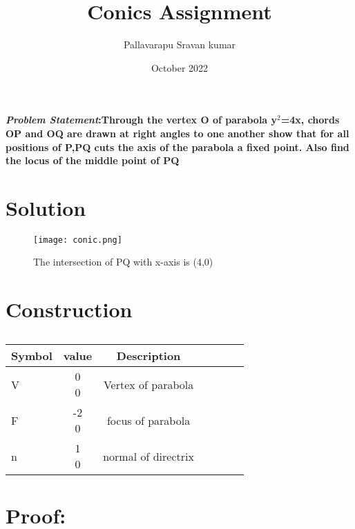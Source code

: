 \documentclass[journal,10pt,twocolumn]{article}
\title{\textbf{Conics Assignment}}
\author{Pallavarapu Sravan kumar}
\date{October 2022}
\newcommand{\myvec}[1]{\ensuremath{\begin{pmatrix}#1\end{pmatrix}}}
\begin{document}
\maketitle
\paragraph{\textit{\large Problem Statement}:Through the vertex O of parabola y$^2$=4x, chords OP and OQ are drawn at right angles to one another show that for all positions of P,PQ cuts the axis of the parabola a fixed point. Also find the locus of the middle point of PQ}
\section*{\large Solution}
\begin{figure}[H]
\centering
\texttt{[image: conic.png]}
\caption{The intersection of PQ with x-axis  is (4,0)}
\end{figure}

\section*{\large Construction}

\begin{table}[htbp]
 \begin{center}
    \begin{tabular}{|l|c|c|c|c|c|c} \hline \textbf{Symbol}
  & \textbf{value} & \textbf{Description} \\
 \hline
V &\myvec{0\\0} & Vertex of parabola\\ \hline
F&\myvec{-2\\0} & focus of parabola\\ \hline
n &\myvec{1\\0}   & normal of directrix\\ \hline

 
\end{tabular}   
\end{center}
\caption{\label{table:dummytable} }
\end{table}



\section*{Proof:}
\end{document}

